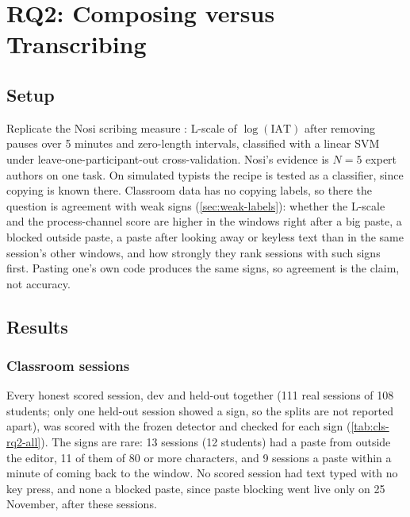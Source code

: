 \chapter{RQ2: Composing versus Transcribing}
\label{ch:rq2}
\section{Setup}
Replicate the Nosi scribing measure \cite{lueder2026nosi}: L-scale of
$\log(\mathrm{IAT})$ after removing pauses over 5 minutes and zero-length
intervals, classified with a linear SVM under leave-one-participant-out
cross-validation. Nosi's evidence is $N = 5$ expert authors on one task.
On simulated typists the recipe is tested as a classifier, since copying is known
there. Classroom data has no copying labels, so there the question is agreement with
weak signs (\cref{sec:weak-labels}): whether the L-scale and the process-channel score
are higher in the windows right after a big paste, a blocked outside paste, a paste after
looking away or keyless text than in the same session's other windows, and how strongly they
rank sessions with such signs first. Pasting one's own code produces the same signs, so
agreement is the claim, not accuracy.
\section{Results}
\subsection{Classroom sessions}
Every honest scored session, dev and held-out together (111 real sessions of 108 students;
only one held-out session showed a sign, so the splits are not reported apart), was scored
with the frozen detector and checked for each sign (\cref{tab:cls-rq2-all}). The signs are
rare: 13 sessions (12 students) had a paste from outside the editor, 11 of them of 80 or more
characters, and 9 sessions a paste within a minute of coming back to the window. No scored
session had text typed with no key press, and none a blocked paste, since paste blocking went
live only on 25 November, after these sessions.

